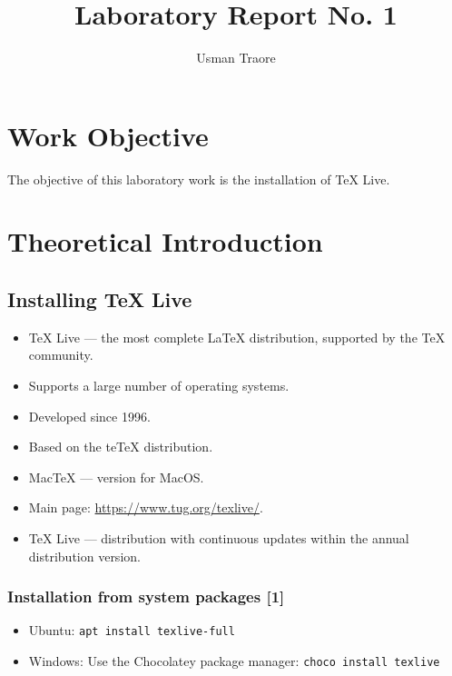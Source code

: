 \documentclass{article}
\author{Usman Traore}
\title{Laboratory Report No. 1}
\begin{document}
\maketitle
\pagebreak

\section{Work Objective}
The objective of this laboratory work is the installation of TeX Live.

\section{Theoretical Introduction}

\subsection{Installing TeX Live}

\begin{itemize}
\item TeX Live — the most complete LaTeX distribution, supported by the TeX community.
\item Supports a large number of operating systems.
\item Developed since 1996.
\item Based on the teTeX distribution.
\item MacTeX — version for MacOS.
\item Main page: \url{https://www.tug.org/texlive/}.
\item TeX Live — distribution with continuous updates within the annual distribution version.
\end{itemize}

\subsubsection{Installation from system packages [1]}
\begin{itemize}
\item Ubuntu: \texttt{apt install texlive-full}
\item Windows: Use the Chocolatey package manager: \texttt{choco install texlive}
\end{itemize}
\end{document}
